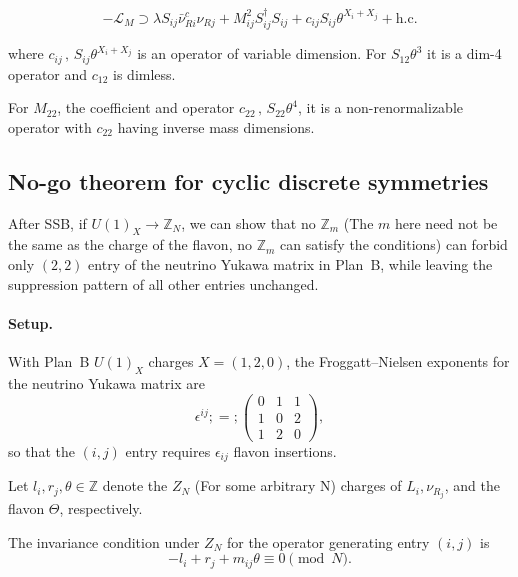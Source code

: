 \begin{equation}
    -\mathcal{L}_{M} \supset \lambda S_{ij} \bar{\nu}^c_{Ri} \nu_{Rj} + M_{ij}^2 S^\dagger_{ij}S_{ij} + c_{ij} S_{ij} \theta^{X_i + X_j} + \text{h.c.}
\end{equation}

where $c_{ij} \, , \, S_{ij} \theta^{X_i + X_j} $ is an operator of variable dimension. For $S_{12}\theta^3$ it is a dim-4 operator and $c_{12}$ is dimless.

For $M_{22}$, the coefficient and operator  $c_{22} \, , \, S_{22} \theta^{4}$, it is a non-renormalizable operator with $c_{22}$ having inverse mass dimensions.



\subsection{No-go theorem for cyclic discrete symmetries}

After SSB, if $U(1)_X \rightarrow \mathbb{Z}_N$, we can show that no $\mathbb{Z}_m$ (The $m$ here need not be the same as the charge of the flavon, no $\mathbb{Z}_m$ can satisfy the conditions) can forbid only $(2,2)$ entry of the neutrino Yukawa matrix in Plan~B, while leaving the suppression pattern of all other entries unchanged.

\paragraph{Setup.}
With Plan~B $U(1)_X$ charges $X=(1,2,0)$, the Froggatt–Nielsen exponents for the neutrino Yukawa matrix are
\begin{equation}
    \epsilon^{ij} ;=;
    \begin{pmatrix}
    0 & 1 & 1  \\
    1 & 0 & 2  \\
    1 & 2 & 0
    \end{pmatrix},
\end{equation}
so that the $(i,j)$ entry requires $\epsilon_{ij}$ flavon insertions.

Let $l_i, r_j, \theta \in \mathbb{Z}$ denote the $Z_N$ (For some arbitrary N) charges of $L_i, \nu_{R_j}$, and the flavon $\Theta$, respectively.

The invariance condition under $Z_N$ for the operator generating entry $(i,j)$ is
\begin{equation}
-l_i + r_j + m_{ij} \theta \equiv 0 \pmod N.
\label{eq:invariance}
\end{equation}


